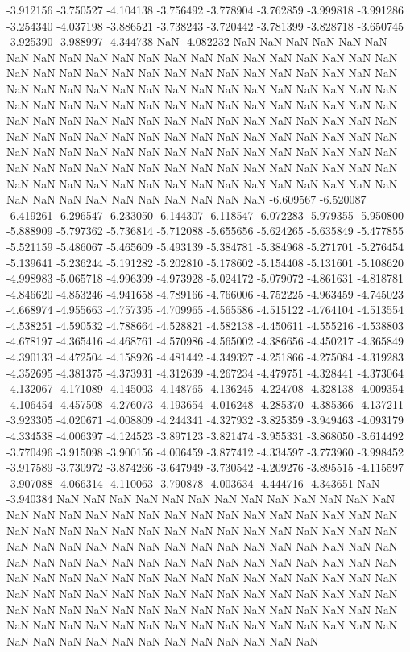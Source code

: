 -3.912156
-3.750527
-4.104138
-3.756492
-3.778904
-3.762859
-3.999818
-3.991286
-3.254340
-4.037198
-3.886521
-3.738243
-3.720442
-3.781399
-3.828718
-3.650745
-3.925390
-3.988997
-4.344738
NaN
-4.082232
NaN
NaN
NaN
NaN
NaN
NaN
NaN
NaN
NaN
NaN
NaN
NaN
NaN
NaN
NaN
NaN
NaN
NaN
NaN
NaN
NaN
NaN
NaN
NaN
NaN
NaN
NaN
NaN
NaN
NaN
NaN
NaN
NaN
NaN
NaN
NaN
NaN
NaN
NaN
NaN
NaN
NaN
NaN
NaN
NaN
NaN
NaN
NaN
NaN
NaN
NaN
NaN
NaN
NaN
NaN
NaN
NaN
NaN
NaN
NaN
NaN
NaN
NaN
NaN
NaN
NaN
NaN
NaN
NaN
NaN
NaN
NaN
NaN
NaN
NaN
NaN
NaN
NaN
NaN
NaN
NaN
NaN
NaN
NaN
NaN
NaN
NaN
NaN
NaN
NaN
NaN
NaN
NaN
NaN
NaN
NaN
NaN
NaN
NaN
NaN
NaN
NaN
NaN
NaN
NaN
NaN
NaN
NaN
NaN
NaN
NaN
NaN
NaN
NaN
NaN
NaN
NaN
NaN
NaN
NaN
NaN
NaN
NaN
NaN
NaN
NaN
NaN
NaN
NaN
NaN
NaN
NaN
NaN
NaN
NaN
NaN
NaN
NaN
NaN
NaN
NaN
NaN
NaN
NaN
NaN
NaN
NaN
NaN
NaN
NaN
NaN
-6.609567
-6.520087
-6.419261
-6.296547
-6.233050
-6.144307
-6.118547
-6.072283
-5.979355
-5.950800
-5.888909
-5.797362
-5.736814
-5.712088
-5.655656
-5.624265
-5.635849
-5.477855
-5.521159
-5.486067
-5.465609
-5.493139
-5.384781
-5.384968
-5.271701
-5.276454
-5.139641
-5.236244
-5.191282
-5.202810
-5.178602
-5.154408
-5.131601
-5.108620
-4.998983
-5.065718
-4.996399
-4.973928
-5.024172
-5.079072
-4.861631
-4.818781
-4.846620
-4.853246
-4.941658
-4.789166
-4.766006
-4.752225
-4.963459
-4.745023
-4.668974
-4.955663
-4.757395
-4.709965
-4.565586
-4.515122
-4.764104
-4.513554
-4.538251
-4.590532
-4.788664
-4.528821
-4.582138
-4.450611
-4.555216
-4.538803
-4.678197
-4.365416
-4.468761
-4.570986
-4.565002
-4.386656
-4.450217
-4.365849
-4.390133
-4.472504
-4.158926
-4.481442
-4.349327
-4.251866
-4.275084
-4.319283
-4.352695
-4.381375
-4.373931
-4.312639
-4.267234
-4.479751
-4.328441
-4.373064
-4.132067
-4.171089
-4.145003
-4.148765
-4.136245
-4.224708
-4.328138
-4.009354
-4.106454
-4.457508
-4.276073
-4.193654
-4.016248
-4.285370
-4.385366
-4.137211
-3.923305
-4.020671
-4.008809
-4.244341
-4.327932
-3.825359
-3.949463
-4.093179
-4.334538
-4.006397
-4.124523
-3.897123
-3.821474
-3.955331
-3.868050
-3.614492
-3.770496
-3.915098
-3.900156
-4.006459
-3.877412
-4.334597
-3.773960
-3.998452
-3.917589
-3.730972
-3.874266
-3.647949
-3.730542
-4.209276
-3.895515
-4.115597
-3.907088
-4.066314
-4.110063
-3.790878
-4.003634
-4.444716
-4.343651
NaN
-3.940384
NaN
NaN
NaN
NaN
NaN
NaN
NaN
NaN
NaN
NaN
NaN
NaN
NaN
NaN
NaN
NaN
NaN
NaN
NaN
NaN
NaN
NaN
NaN
NaN
NaN
NaN
NaN
NaN
NaN
NaN
NaN
NaN
NaN
NaN
NaN
NaN
NaN
NaN
NaN
NaN
NaN
NaN
NaN
NaN
NaN
NaN
NaN
NaN
NaN
NaN
NaN
NaN
NaN
NaN
NaN
NaN
NaN
NaN
NaN
NaN
NaN
NaN
NaN
NaN
NaN
NaN
NaN
NaN
NaN
NaN
NaN
NaN
NaN
NaN
NaN
NaN
NaN
NaN
NaN
NaN
NaN
NaN
NaN
NaN
NaN
NaN
NaN
NaN
NaN
NaN
NaN
NaN
NaN
NaN
NaN
NaN
NaN
NaN
NaN
NaN
NaN
NaN
NaN
NaN
NaN
NaN
NaN
NaN
NaN
NaN
NaN
NaN
NaN
NaN
NaN
NaN
NaN
NaN
NaN
NaN
NaN
NaN
NaN
NaN
NaN
NaN
NaN
NaN
NaN
NaN
NaN
NaN
NaN
NaN
NaN
NaN
NaN
NaN
NaN
NaN
NaN
NaN
NaN
NaN
NaN
